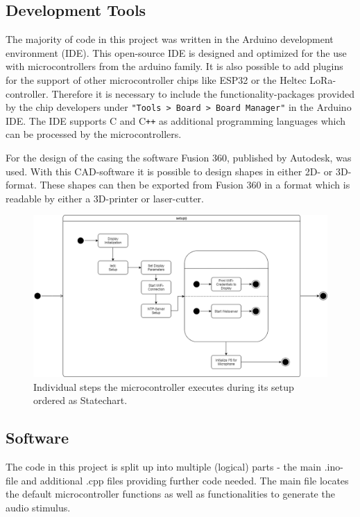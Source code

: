 \subsection{Development Tools}
The majority of code in this project was written in the Arduino development environment (IDE). 
This open-source IDE is designed and optimized for the use with microcontrollers from the arduino family.
It is also possible to add plugins for the support of other microcontroller chips like ESP32 or the Heltec LoRa-controller.
Therefore it is necessary to include the functionality-packages provided by the chip developers under \texttt{"Tools > Board > Board Manager"} in the Arduino IDE.
The IDE supports C and C\texttt{++} as additional programming languages which can be processed by the microcontrollers.

For the design of the casing the software Fusion 360, published by Autodesk, was used.
With this CAD-software it is possible to design shapes in either 2D- or 3D-format.
These shapes can then be exported from Fusion 360 in a format which is readable by either a 3D-printer or laser-cutter.
 

\begin{figure}[H]
	\includegraphics[width=\linewidth]{Media/Controller_setup.png}
	\caption{Individual steps the microcontroller executes during its setup ordered as Statechart.}
	\label{fig:cntrlr_stp}
\end{figure}

\subsection{Software}
The code in this project is split up into multiple (logical) parts - the main .ino-file and additional .cpp files providing further code needed.
The main file locates the default microcontroller functions as well as functionalities to generate the audio stimulus.

